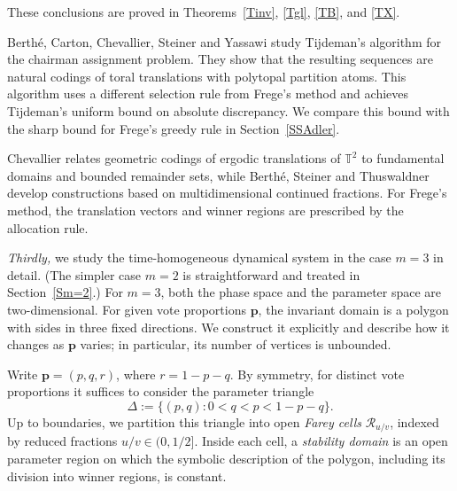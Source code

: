 \documentclass[11pt,reqno,tbtags,a4paper]{amsart}
\numberwithin{equation}{section}
\theoremstyle{plain}%
\theoremstyle{definition}
\theoremstyle{remark}
\newcommand{\refS}[1]{Section~\ref{#1}}
\newcommand{\refSS}[1]{Section~\ref{#1}}
\newcommand\bbT{\mathbb T}
\newcounter{CC}
\newcommand\cR{{\mathcal R}}
\newcommand\vp{\mathbf{p}}
\newcommand\0{{\boldsymbol 0}}
\newcommand\1{{\boldsymbol 1}}
\begin{document}
These conclusions are proved in Theorems~\ref{Tinv}, \ref{Tgl},
\ref{TB}, and \ref{TX}.

Berth\'e, Carton, Chevallier, Steiner and Yassawi \cite{BCCSY24}
study Tijdeman's algorithm for the chairman assignment problem.
They show that the resulting sequences are natural codings of toral
translations with polytopal partition atoms.
This algorithm uses a different selection rule from Frege's method and
achieves Tijdeman's uniform bound on absolute discrepancy.
We compare this bound with the sharp bound for Frege's greedy rule
in \refSS{SSAdler}.

Chevallier \cite{Chev} relates geometric codings of ergodic translations
of $\bbT^2$ to fundamental
domains and bounded remainder sets, while Berth\'e, Steiner and
Thuswaldner \cite{BST23} develop constructions based on multidimensional
continued fractions. For Frege's method, the translation vectors and
winner regions are prescribed by the allocation rule.


\medskip
\emph{Thirdly,}
we study the time-homogeneous dynamical system in the case $m=3$ in detail.
(The simpler case $m=2$ is straightforward and treated in \refS{Sm=2}.)
For $m=3$, both the phase space and the parameter space are two-dimensional.
For given vote proportions $\vp$,
the invariant domain is a polygon with sides in three fixed directions.
We construct it explicitly and describe how it changes as $\vp$ varies;
in particular, its number of vertices is unbounded.

Write $\vp=(p,q,r)$, where $r=1-p-q$. By symmetry, for distinct vote
proportions it suffices to consider the parameter triangle
\begin{equation}
 \Delta:=\{(p,q):0<q<p<1-p-q\}.
\end{equation}
Up to boundaries, we partition this triangle into open \emph{Farey cells}
$\cR_{u/v}$, indexed by reduced fractions $u/v\in(0,1/2]$.
Inside each cell, a \emph{stability domain} is an open parameter region
on which the symbolic description of the polygon, including its division
into winner regions, is constant.
\end{document}
